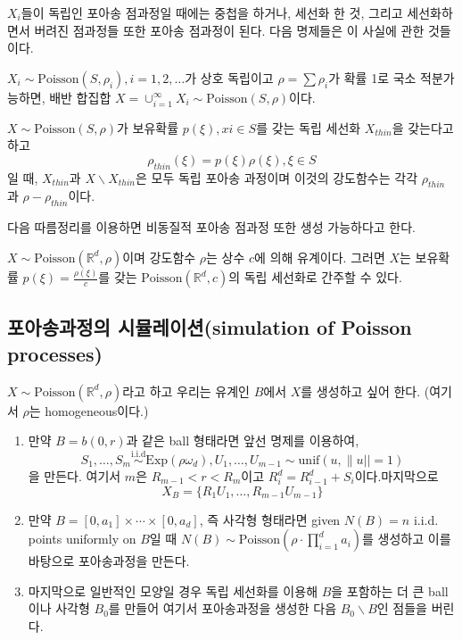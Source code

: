 \documentclass[b5paper,]{scrbook}
\theoremstyle{plain}
\theoremstyle{definition}
\numberwithin{equation}{section}
\let\BeginKnitrBlock\begin \let\EndKnitrBlock\end
\begin{document}
\(X_{i}\)들이 독립인 포아송 점과정일 때에는 중첩을 하거나, 세선화 한 것, 그리고 세선화하면서 버려진 점과정들 또한 포아송 점과정이 된다. 다음 명제들은 이 사실에 관한 것들이다.

\BeginKnitrBlock{proposition}[포아송 점과정의 중첩과 세선화]
\protect\hypertarget{prp:unnamed-chunk-407}{}{\label{prp:unnamed-chunk-407} {} }\(X_{i}\sim \text{Poisson}(S,\rho_{i}), i=1,2,\ldots\)가 상호 독립이고 \(\rho=\sum\rho_{i}\)가 확률 1로 국소 적분가능하면, 배반 합집합 \(X=\cup_{i=1}^{\infty}X_{i}\sim\text{Poisson}(S,\rho)\)이다.
\EndKnitrBlock{proposition}

\BeginKnitrBlock{proposition}[독립 세선화]
\protect\hypertarget{prp:unnamed-chunk-408}{}{\label{prp:unnamed-chunk-408} {} }\(X \sim \text{Poisson}(S,\rho)\)가 보유확률 \(p(\xi), xi\in S\)를 갖는 독립 세선화 \(X_{thin}\)을 갖는다고 하고
\[\rho_{thin}(\xi)=p(\xi)\rho(\xi), \xi\in S\]
일 때, \(X_{thin}\)과 \(X\backslash X_{thin}\)은 모두 독립 포아송 과정이며 이것의 강도함수는 각각 \(\rho_{thin}\)과 \(\rho-\rho_{thin}\)이다.
\EndKnitrBlock{proposition}

다음 따름정리를 이용하면 비동질적 포아송 점과정 또한 생성 가능하다고 한다.

\BeginKnitrBlock{corollary}
\protect\hypertarget{cor:unnamed-chunk-409}{}{\label{cor:unnamed-chunk-409} }\(X \sim \text{Poisson}(\mathbb{R}^{d}, \rho)\)이며 강도함수 \(\rho\)는 상수 \(c\)에 의해 유계이다. 그러면 \(X\)는 보유확률 \(p(\xi)=\frac{\rho(\xi)}{c}\)를 갖는 \(\text{Poisson}(\mathbb{R}^{d},c)\)의 독립 세선화로 간주할 수 있다.
\EndKnitrBlock{corollary}

\hypertarget{-simulation-of-poisson-processes}{%
\subsection{포아송과정의 시뮬레이션(simulation of Poisson processes)}\label{-simulation-of-poisson-processes}}

\(X \sim \text{Poisson}(\mathbb{R}^{d},\rho)\)라고 하고 우리는 유계인 \(B\)에서 \(X\)를 생성하고 싶어 한다. (여기서 \(\rho\)는 homogeneous이다.)

\begin{enumerate}
\def\labelenumi{\arabic{enumi}.}
\item
  만약 \(B=b(0,r)\)과 같은 ball 형태라면 앞선 명제를 이용하여,
  \[S_{1},\ldots , S_{m} \stackrel{\text{i.i.d}}{\sim} \text{Exp}(\rho\omega_{d}), U_{1},\ldots, U_{m-1} \sim \text{unif}(u, \| u||=1)\]
  을 만든다. 여기서 \(m\)은 \(R_{m-1}<r<R_{m}\)이고 \(R_{i}^{d}=R_{i-1}^{d}+S_{i}\)이다.마지막으로
  \[X_{B}=\{ R_{1}U_{1},\ldots , R_{m-1}U_{m-1} \}\]
\item
  만약 \(B=[0,a_{1}]\times \cdots \times [0,a_{d}]\), 즉 사각형 형태라면 given \(N(B)=n\) i.i.d. points uniformly on \(B\)일 때 \(N(B) \sim \text{Poisson}(\rho\cdot\prod_{i=1}^{d}a_{i})\)를 생성하고 이를 바탕으로 포아송과정을 만든다.
\item
  마지막으로 일반적인 모양일 경우 독립 세선화를 이용해 \(B\)을 포함하는 더 큰 ball이나 사각형 \(B_{0}\)를 만들어 여기서 포아송과정을 생성한 다음 \(B_{0}\backslash B\)인 점들을 버린다.
\end{enumerate}
\end{document}
